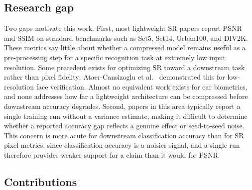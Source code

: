 \documentclass[pdflatex,sn-vancouver-num]{sn-jnl}
\begin{document}
\subsection{Research gap}

Two gaps motivate this work. First, most lightweight SR papers report PSNR and SSIM on standard benchmarks such as Set5, Set14, Urban100, and DIV2K. These metrics say little about whether a compressed model remains useful as a pre-processing step for a specific recognition task at extremely low input resolution. Some precedent exists for optimizing SR toward a downstream task rather than pixel fidelity: Ataer-Cansizoglu et al.~\cite{ataer2019identity} demonstrated this for low-resolution face verification. Almost no equivalent work exists for ear biometrics, and none addresses how far a lightweight architecture can be compressed before downstream accuracy degrades. Second, papers in this area typically report a single training run without a variance estimate, making it difficult to determine whether a reported accuracy gap reflects a genuine effect or seed-to-seed noise. This concern is more acute for downstream classification accuracy than for SR pixel metrics, since classification accuracy is a noisier signal, and a single run therefore provides weaker support for a claim than it would for PSNR.

\subsection{Contributions}
\end{document}
